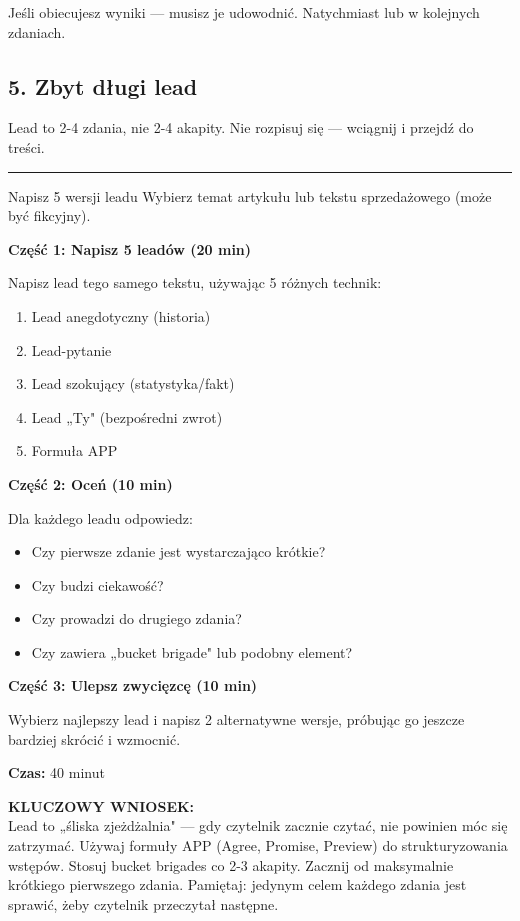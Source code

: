 \documentclass[
  12pt,
  a4paper,
  twoside,
  openright,
  12pt,
  DIV=12,
  BCOR=12mm]{scrbook}
\newcommand{\decoline}{%
  \begin{center}
    \textcolor{bordergray}{\rule{0.3\textwidth}{0.5pt}}
  \end{center}
}
\newcommand{\takeaway}[1]{%
  \begin{tcolorbox}[
    enhanced,
    colback=accentgreen!10,
    colframe=accentgreen,
    boxrule=0pt,
    borderline south={3pt}{0pt}{accentgreen},
    sharp corners,
    left=15pt, right=15pt, top=10pt, bottom=10pt
  ]
    \textbf{\color{accentgreen}KLUCZOWY WNIOSEK:}\\[5pt]
    #1
  \end{tcolorbox}
}
\begin{document}
Jeśli obiecujesz wyniki --- musisz je udowodnić. Natychmiast lub w
kolejnych zdaniach.

\subsection{5. Zbyt długi lead}\label{zbyt-dux142ugi-lead}

Lead to 2-4 zdania, nie 2-4 akapity. Nie rozpisuj się --- wciągnij i
przejdź do treści.

\decoline

\begin{cwiczenie}{Napisz 5 wersji leadu}
Wybierz temat artykułu lub tekstu sprzedażowego (może być fikcyjny).

\textbf{Część 1: Napisz 5 leadów (20 min)}

Napisz lead tego samego tekstu, używając 5 różnych technik:
\begin{enumerate}
  \item Lead anegdotyczny (historia)
  \item Lead-pytanie
  \item Lead szokujący (statystyka/fakt)
  \item Lead „Ty" (bezpośredni zwrot)
  \item Formuła APP
\end{enumerate}

\textbf{Część 2: Oceń (10 min)}

Dla każdego leadu odpowiedz:
\begin{itemize}
  \item Czy pierwsze zdanie jest wystarczająco krótkie?
  \item Czy budzi ciekawość?
  \item Czy prowadzi do drugiego zdania?
  \item Czy zawiera „bucket brigade" lub podobny element?
\end{itemize}

\textbf{Część 3: Ulepsz zwycięzcę (10 min)}

Wybierz najlepszy lead i napisz 2 alternatywne wersje, próbując go jeszcze bardziej skrócić i wzmocnić.

\textbf{Czas:} 40 minut
\end{cwiczenie}

\takeaway{Lead to „śliska zjeżdżalnia" --- gdy czytelnik zacznie czytać, nie powinien móc się zatrzymać. Używaj formuły APP (Agree, Promise, Preview) do strukturyzowania wstępów. Stosuj bucket brigades co 2-3 akapity. Zacznij od maksymalnie krótkiego pierwszego zdania. Pamiętaj: jedynym celem każdego zdania jest sprawić, żeby czytelnik przeczytał następne.}
\end{document}
